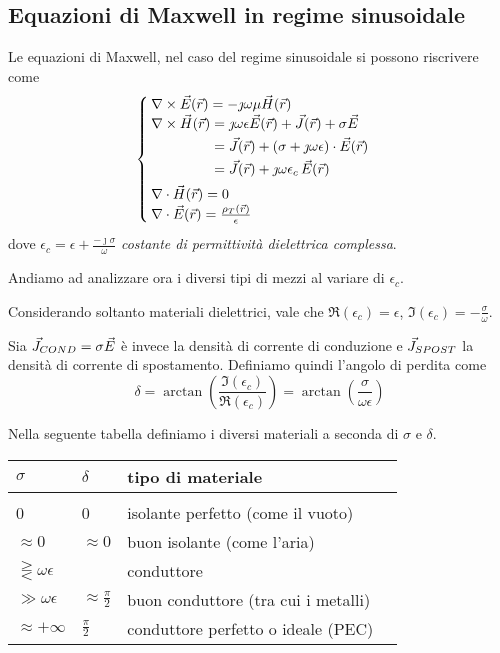 \subsection{Equazioni di Maxwell in regime sinusoidale}
Le equazioni di Maxwell, nel caso del regime sinusoidale si possono riscrivere come
\begin{equation}\begin{cases}
	\nabla\times\vec{E}(\vec{r}) = -\jmath \omega \mu\vec{H}(\vec{r}) \\
	\begin{aligned}[b]
		\nabla\times\vec{H}(\vec{r}) &= \jmath	\omega \epsilon \vec{E}(\vec{r}) + \vec{J}(\vec{r}) + \sigma\vec{E} \\
		&= \vec{J}(\vec{r}) +(\sigma + \jmath \omega \epsilon) \cdot \vec{E}(\vec{r}) \\
		&= \vec{J}(\vec{r}) +\jmath \omega \epsilon_c \, \vec{E}(\vec{r}) \\
	\end{aligned} \\
  \nabla\cdot\vec{H}(\vec{r})=0\\
  \nabla\cdot \vec{E}(\vec{r}) = \frac{\rho_T(\vec{r})}{\epsilon}
\end{cases}\end{equation}
dove $\epsilon_c = \epsilon + \frac{-\jmath\sigma}{\omega}$ \emph{costante di permittività dielettrica complessa}.

Andiamo ad analizzare ora i diversi tipi di mezzi al variare di $\epsilon_c$.

\begin{definition}
	Considerando soltanto materiali dielettrici, vale che $\Re(\epsilon_c) = \epsilon$, $\Im(\epsilon_c) = -\frac{\sigma}{\omega}$.

	Sia $\vec{J}_{COND} = \sigma \vec{E}$ è invece la densità di corrente di conduzione e $\vec{J}_{SPOST}$ la densità di corrente di spostamento.
	Definiamo quindi l'angolo di perdita come
	\begin{equation}
		\delta = \arctan \left(\frac{\Im(\epsilon_c)}{\Re(\epsilon_c)}\right) = \arctan\left(\frac{\sigma}{\omega \epsilon}\right)
		\end{equation}
\end{definition}

Nella seguente tabella definiamo i diversi materiali a seconda di $\sigma$ e $\delta$.
\begin{table}[h] \label{tab:conductors}
\centering
\begin{tabular}{llll}
	$\sigma$ & $\delta$ & tipo di materiale \\
	\hline \\
	0 & 0 & isolante perfetto (come il vuoto) \\
	$\approx 0$ & $\approx 0$ & buon isolante (come l'aria) \\
	$\gtreqless \omega \epsilon $ & & conduttore \\
	$\gg \omega \epsilon$ & $\approx \frac{\pi}{2}$ & buon conduttore (tra cui i metalli) \\
	$\approx +\infty$ & $\frac{\pi}{2}$ & conduttore perfetto o ideale (PEC)
\end{tabular}
\end{table}


